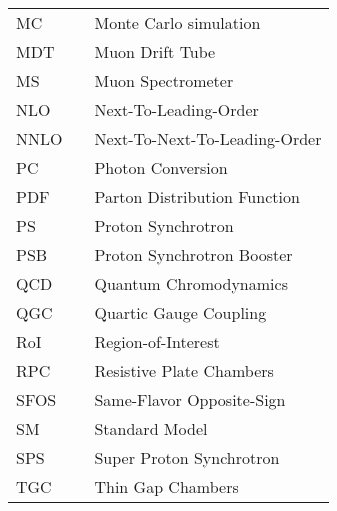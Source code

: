   \begin{tabular}{lp{}p{}}
    MC          & \dotfill & Monte Carlo simulation \\
    MDT         & \dotfill & Muon Drift Tube \\
    MS          & \dotfill & Muon Spectrometer \\
    NLO         & \dotfill & Next-To-Leading-Order \\
    NNLO         & \dotfill & Next-To-Next-To-Leading-Order \\
    PC          & \dotfill & Photon Conversion \\
    PDF         & \dotfill & Parton Distribution Function \\
    PS          & \dotfill & Proton Synchrotron \\
    PSB         & \dotfill & Proton Synchrotron Booster \\
    QCD         & \dotfill & Quantum Chromodynamics \\
    QGC         & \dotfill & Quartic Gauge Coupling \\
    RoI         & \dotfill & Region-of-Interest \\
    RPC         & \dotfill & Resistive Plate Chambers \\
    SFOS        & \dotfill & Same-Flavor Opposite-Sign \\
    SM          & \dotfill & Standard Model  \\
    SPS         & \dotfill & Super Proton Synchrotron \\
    TGC         & \dotfill & Thin Gap Chambers \\

  \end{tabular}


